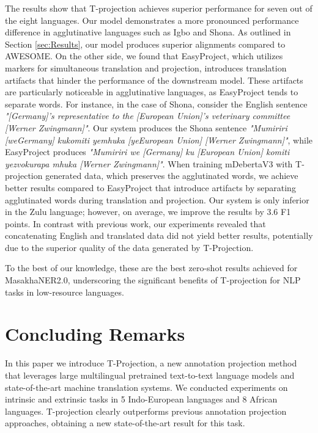 \documentclass[11pt]{article}
\begin{document}
The results show that T-projection achieves superior performance for seven out of the eight languages. Our model demonstrates a more pronounced performance difference in agglutinative languages such as Igbo and Shona. As outlined in Section \ref{sec:Results}, our model produces superior alignments compared to AWESOME. On the other side, we found that EasyProject, which utilizes markers for simultaneous translation and projection, introduces translation artifacts that hinder the performance of the downstream model. These artifacts are particularly noticeable in agglutinative languages, as EasyProject tends to separate words. For instance, in the case of Shona, consider the English sentence \textit{"[Germany]'s representative to the [European Union]'s veterinary committee [Werner Zwingmann]"}. Our system produces the Shona sentence \textit{"Mumiriri [weGermany] kukomiti yemhuka [yeEuropean Union] [Werner Zwingmann]"}, while EasyProject produces \textit{"Mumiriri we [Germany] ku [European Union] komiti yezvokurapa mhuka [Werner Zwingmann]"}. When training mDebertaV3 with T-projection generated data, which preserves the agglutinated words, we achieve better results compared to EasyProject that introduce artifacts by separating agglutinated words during translation and projection. Our system is only inferior in the Zulu language; however, on average, we improve the results by 3.6 F1 points. In contrast with previous work, our experiments revealed that concatenating English and translated data did not yield better results, potentially due to the superior quality of the data generated by T-Projection. 

To the best of our knowledge, these are the best zero-shot results achieved for MasakhaNER2.0, underscoring the significant benefits of T-projection for NLP tasks in low-resource languages.




\section{Concluding Remarks}

In this paper we introduce T-Projection, a new annotation projection method that leverages
large multilingual pretrained text-to-text language models and state-of-the-art
machine translation systems. We conducted experiments on intrinsic and extrinsic tasks in 5 Indo-European languages and 8 African languages. T-projection clearly outperforms previous annotation
projection approaches, obtaining a new state-of-the-art result for this task.
\end{document}
